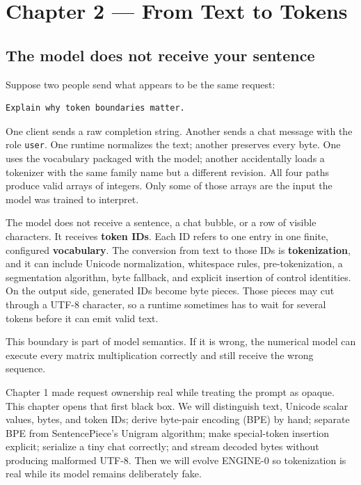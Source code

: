 \documentclass[
  10pt,
]{article}
\begin{document}
\clearpage

\section{Chapter 2 --- From Text to
Tokens}\label{chapter-2-from-text-to-tokens}

\subsection{The model does not receive your
sentence}\label{the-model-does-not-receive-your-sentence}

Suppose two people send what appears to be the same request:

\begin{verbatim}
Explain why token boundaries matter.
\end{verbatim}

One client sends a raw completion string. Another sends a chat message
with the role \texttt{user}. One runtime normalizes the text; another
preserves every byte. One uses the vocabulary packaged with the model;
another accidentally loads a tokenizer with the same family name but a
different revision. All four paths produce valid arrays of integers.
Only some of those arrays are the input the model was trained to
interpret.

The model does not receive a sentence, a chat bubble, or a row of
visible characters. It receives \textbf{token IDs}. Each ID refers to
one entry in one finite, configured \textbf{vocabulary}. The conversion
from text to those IDs is \textbf{tokenization}, and it can include
Unicode normalization, whitespace rules, pre-tokenization, a
segmentation algorithm, byte fallback, and explicit insertion of control
identities. On the output side, generated IDs become byte pieces. Those
pieces may cut through a UTF-8 character, so a runtime sometimes has to
wait for several tokens before it can emit valid text.

This boundary is part of model semantics. If it is wrong, the numerical
model can execute every matrix multiplication correctly and still
receive the wrong sequence.

Chapter 1 made request ownership real while treating the prompt as
opaque. This chapter opens that first black box. We will distinguish
text, Unicode scalar values, bytes, and token IDs; derive byte-pair
encoding (BPE) by hand; separate BPE from SentencePiece's Unigram
algorithm; make special-token insertion explicit; serialize a tiny chat
correctly; and stream decoded bytes without producing malformed UTF-8.
Then we will evolve ENGINE-0 so tokenization is real while its model
remains deliberately fake.
\end{document}
